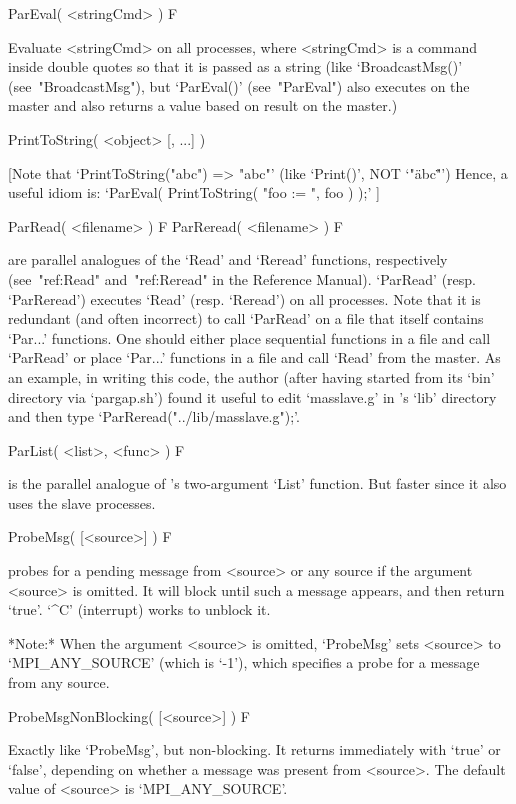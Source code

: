 \>ParEval( <stringCmd> ) F

Evaluate <stringCmd> on all processes, where  <stringCmd>  is  a  command
inside  double  quotes  so  that  it  is  passed  as   a   string   (like
`BroadcastMsg()' (see~"BroadcastMsg"),  but  `ParEval()'  (see~"ParEval")
also executes on the master and also returns a value based on  result  on
the master.)

\>PrintToString( <object> [, ...] )

   [Note that `PrintToString("abc") => "abc"' 
    (like `Print()', NOT `"\"abc\""')
     Hence, a useful idiom is:  `ParEval( PrintToString( "foo := ", foo ) );'  ]

\>ParRead( <filename> ) F
\>ParReread( <filename> ) F

are parallel analogues of  the  {\GAP}  `Read'  and  `Reread'  functions,
respectively (see~"ref:Read" and~"ref:Reread" in the  Reference  Manual).
`ParRead' (resp. `ParReread') executes `Read'  (resp.  `Reread')  on  all
processes. Note that it  is  redundant  (and  often  incorrect)  to  call
`ParRead' on a file that itself contains `Par...' functions.  One  should
either place sequential functions in a file and call `ParRead'  or  place
`Par...' functions in a file and call  `Read'  from  the  master.  As  an
example, in writing this code, the author (after having started {\ParGAP}
from its `bin'  directory  via  `pargap.sh')  found  it  useful  to  edit
`masslave.g'   in   {\ParGAP}'s   `lib'   directory   and    then    type
`ParReread("../lib/masslave.g");'.

\>ParList( <list>, <func> ) F

is the parallel analogue of {\GAP}'s two-argument  `List'  function.  But
faster since it also uses the slave processes.

\>ProbeMsg( [<source>] ) F

probes for a pending message from <source> or any source if the  argument
<source> is omitted. It will block until such a message appears, and then
return `true'. `^C' (interrupt) works to unblock it.

*Note:*
When the argument  <source>  is  omitted,  `ProbeMsg'  sets  <source>  to
`MPI_ANY_SOURCE' (which is `-1'), which specifies a probe for  a  message
from any source.

\>ProbeMsgNonBlocking( [<source>] ) F

Exactly like `ProbeMsg', but non-blocking. It  returns  immediately  with
`true' or `false', depending  on  whether  a  message  was  present  from
<source>. The default value of <source> is `MPI_ANY_SOURCE'.

